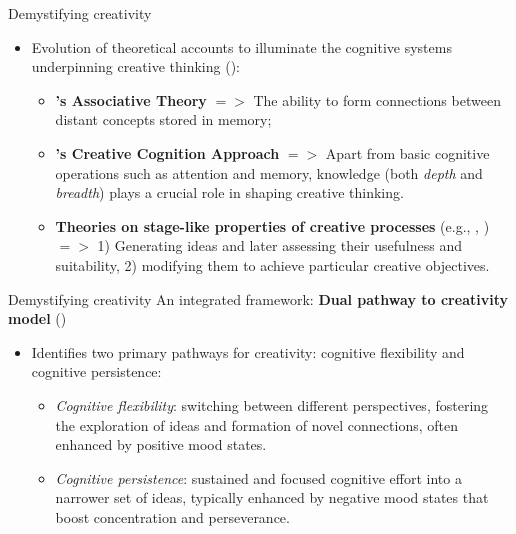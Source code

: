 \documentclass[pdf]{beamer}
\begin{document}
\begin{frame}{Demystifying creativity}
\begin{itemize}
    \item<1-> Evolution of theoretical accounts to illuminate the cognitive systems underpinning creative thinking (\cite{johnson_divergent_2022}):
        \begin{itemize}
            \item<2-> \textbf{\textcite{mednick_associative_1962}'s Associative Theory} $=>$ The ability to form connections between distant concepts stored in memory;
            \item<3-> \textbf{\textcite{kaufman_cambridge_2010}'s Creative Cognition Approach} $=>$ Apart from basic cognitive operations such as attention and memory, knowledge (both \textit{depth} and \textit{breadth}) plays a crucial role in shaping creative thinking.
            \item<4-> \textbf{Theories on stage-like properties of creative processes} (e.g., \cite{finke_creative_1996}, \cite{patterson_personal_2004}) $=>$ 1) Generating ideas and later assessing their usefulness and suitability, 2) modifying them to achieve particular creative objectives.
        \end{itemize}
\end{itemize}
\end{frame}

\begin{frame}{Demystifying creativity}
An integrated framework: \textbf{Dual pathway to creativity model} (\cite{nijstad_dual_2010})
\begin{itemize}
    \item<1-> Identifies two primary pathways for creativity: \alert{cognitive flexibility} and \alert{cognitive persistence}:
        \begin{itemize}
            \item<2-> \textit{Cognitive flexibility}: switching between different perspectives, fostering the exploration of ideas and formation of novel connections, often enhanced by positive mood states.
            \item<3-> \textit{Cognitive persistence}: sustained and focused cognitive effort into a narrower set of ideas, typically enhanced by negative mood states that boost concentration and perseverance.
        \end{itemize}
\end{itemize}

\end{frame}
\end{document}
